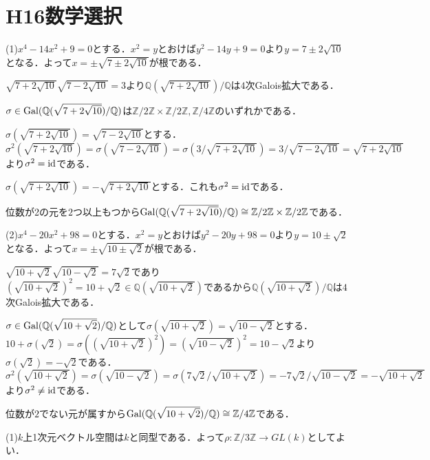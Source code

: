 \documentclass[
		book,
		head_space=20mm,
		foot_space=20mm,
		gutter=10mm,
		line_length=190mm
]{jlreq}
\begin{document}
\section{H16数学選択}
(1)$x^4-14x^2+9=0$とする．$x^2=y$とおけば$y^2-14y+9=0$より$y=7\pm2\sqrt{10}$となる．よって$x=\pm\sqrt{7\pm2\sqrt{10}}$が根である．

$\sqrt{7+2\sqrt{10}}\sqrt{7-2\sqrt{10}}=3$より$\mathbb{Q}(\sqrt{7+2\sqrt{10}})/\mathbb{Q}$は$4$次Galois拡大である．

$\sigma\in \mathop{\mathrm{Gal}}(\mathbb{Q}(\sqrt{7+2\sqrt{10}})/\mathbb{Q})$は$\mathbb{Z}/2\mathbb{Z}\times \mathbb{Z}/2\mathbb{Z},\mathbb{Z}/4\mathbb{Z}$のいずれかである．

$\sigma(\sqrt{7+2\sqrt{10}})=\sqrt{7-2\sqrt{10}}$とする．
$\sigma^2(\sqrt{7+2\sqrt{10}})=\sigma(\sqrt{7-2\sqrt{10}})=\sigma(3/\sqrt{7+2\sqrt{10}})=3/\sqrt{7-2\sqrt{10}}=\sqrt{7+2\sqrt{10}}$より$\sigma^2=\mathop{\mathrm{id}}$である．

$\sigma(\sqrt{7+2\sqrt{10}})=- \sqrt{7+2\sqrt{10}}$とする．これも$\sigma^2=\mathop{\mathrm{id}}$である．

位数が2の元を$2$つ以上もつから$\mathop{\mathrm{Gal}}(\mathbb{Q}(\sqrt{7+2\sqrt{10}})/\mathbb{Q})\cong \mathbb{Z}/2\mathbb{Z}\times \mathbb{Z}/2\mathbb{Z}$である．

(2)$x^4-20x^2+98=0$とする．$x^2=y$とおけば$y^2-20y+98=0$より$y=10\pm\sqrt{2}$となる．よって$x=\pm\sqrt{10\pm\sqrt{2}}$が根である．

$\sqrt{10+\sqrt{2}}\sqrt{10-\sqrt{2}}=7\sqrt{2}$であり$(\sqrt{10+\sqrt{2}})^2=10+\sqrt{2}\in \mathbb{Q}(\sqrt{10+\sqrt{2}})$であるから$\mathbb{Q}(\sqrt{10+\sqrt{2}})/\mathbb{Q}$は$4$次Galois拡大である．

$\sigma\in \mathop{\mathrm{Gal}}(\mathbb{Q}(\sqrt{10+\sqrt{2}})/\mathbb{Q})$として$\sigma(\sqrt{10+\sqrt{2}})=\sqrt{10-\sqrt{2}}$とする．
$10+\sigma(\sqrt{2})=\sigma((\sqrt{10+\sqrt{2}})^2)=(\sqrt{10-\sqrt{2}})^2=10-\sqrt{2}$より$\sigma(\sqrt{2})=-\sqrt{2}$である．
$\sigma^2(\sqrt{10+\sqrt{2}})=\sigma(\sqrt{10-\sqrt{2}})=\sigma(7\sqrt{2}/\sqrt{10+\sqrt{2}})=-7\sqrt{2}/\sqrt{10-\sqrt{2}}=-\sqrt{10+\sqrt{2}}$より$\sigma^2\neq \mathop{\mathrm{id}}$である．

位数が$2$でない元が属すから$\mathop{\mathrm{Gal}}(\mathbb{Q}(\sqrt{10+\sqrt{2}})/\mathbb{Q})\cong \mathbb{Z}/4\mathbb{Z}$である．

(1)$k$上1次元ベクトル空間は$k$と同型である．よって$\rho\colon \mathbb{Z}/3\mathbb{Z}\to GL(k)$としてよい．
\end{document}
